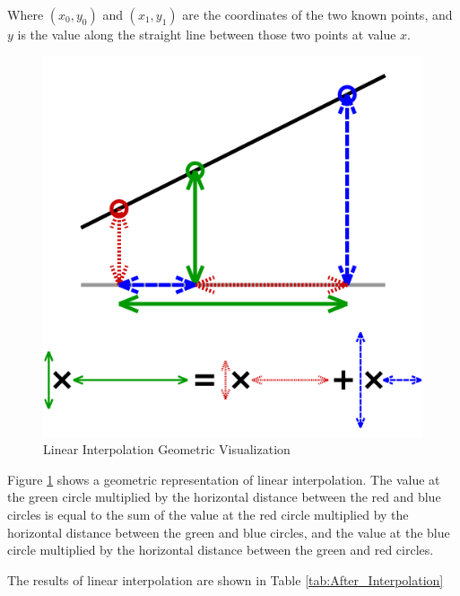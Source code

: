 \documentclass [MS] {uclathes}
\begin{document}
Where $\left(x_{0}, y_{0}\right)$ and $\left(x_{1}, y_{1}\right)$ are the coordinates of the two known points, and $y$ is the value along the straight line between those two points at value $x$. \cite{encyclopediaofmath_linear_interpolation} 

\begin{figure}[h!]
    \centering
    \includegraphics[scale=0.23]{figures/linear_interpolation_visualisation.png}
    \caption{Linear Interpolation Geometric Visualization \cite{Cmglee_linear_interpolation_2022}}
    \label{fig:linear_interpolation_vis}
\end{figure}

Figure \ref{fig:linear_interpolation_vis} shows a geometric representation of linear interpolation. The value at the green circle multiplied by the horizontal distance between the red and blue circles is equal to the sum of the value at the red circle multiplied by the horizontal distance between the green and blue circles, and the value at the blue circle multiplied by the horizontal distance between the green and red circles. \cite{Cmglee_linear_interpolation_2022}

The results of linear interpolation are shown in Table \ref{tab:After_Interpolation}
\end{document}
